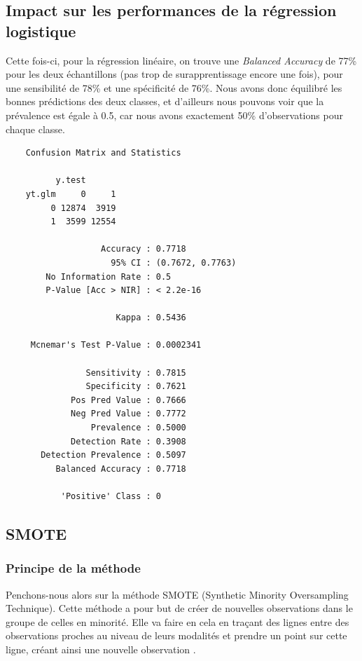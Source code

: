 \documentclass{article}
\begin{document}
\subsection{Impact sur les performances de la régression logistique}

Cette fois-ci, pour la régression linéaire, on trouve une \emph{Balanced Accuracy} de 77\% pour les deux échantillons (pas trop de surapprentissage encore une fois), pour une sensibilité de 78\% et une spécificité de 76\%. Nous avons donc équilibré les bonnes prédictions des deux classes, et d'ailleurs nous pouvons voir que la prévalence est égale à 0.5, car nous avons exactement 50\% d'observations pour chaque classe. 

\begin{multicols}{2}
    \begin{verbatim}
    Confusion Matrix and Statistics

          y.test
    yt.glm     0     1
         0 12874  3919
         1  3599 12554

                   Accuracy : 0.7718          
                     95% CI : (0.7672, 0.7763)
        No Information Rate : 0.5             
        P-Value [Acc > NIR] : < 2.2e-16       

                      Kappa : 0.5436          

     Mcnemar's Test P-Value : 0.0002341       

                Sensitivity : 0.7815          
                Specificity : 0.7621          
             Pos Pred Value : 0.7666          
             Neg Pred Value : 0.7772          
                 Prevalence : 0.5000          
             Detection Rate : 0.3908          
       Detection Prevalence : 0.5097          
          Balanced Accuracy : 0.7718          

           'Positive' Class : 0
    \end{verbatim}
\end{multicols}

\subsection{SMOTE}

\subsubsection{Principe de la méthode}

Penchons-nous alors sur la méthode SMOTE (Synthetic Minority Oversampling Technique). Cette méthode a pour but de créer de nouvelles observations dans le groupe de celles en minorité. Elle va faire en cela en traçant des lignes entre des observations proches au niveau de leurs modalités et prendre un point sur cette ligne, créant ainsi une nouvelle observation \cite{smote}. 
\end{document}
